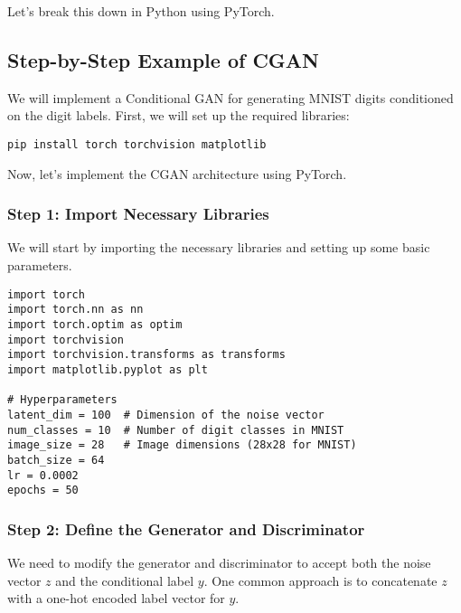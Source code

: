 Let's break this down in Python using PyTorch.

\subsection{Step-by-Step Example of CGAN}
We will implement a Conditional GAN for generating MNIST digits conditioned on the digit labels. First, we will set up the required libraries:

\begin{lstlisting}[style=cmd]
pip install torch torchvision matplotlib
\end{lstlisting}

Now, let's implement the CGAN architecture using PyTorch.

\subsubsection{Step 1: Import Necessary Libraries}
We will start by importing the necessary libraries and setting up some basic parameters.

\begin{lstlisting}[style=python]
import torch
import torch.nn as nn
import torch.optim as optim
import torchvision
import torchvision.transforms as transforms
import matplotlib.pyplot as plt

# Hyperparameters
latent_dim = 100  # Dimension of the noise vector
num_classes = 10  # Number of digit classes in MNIST
image_size = 28   # Image dimensions (28x28 for MNIST)
batch_size = 64
lr = 0.0002
epochs = 50
\end{lstlisting}

\subsubsection{Step 2: Define the Generator and Discriminator}
We need to modify the generator and discriminator to accept both the noise vector \( z \) and the conditional label \( y \). One common approach is to concatenate \( z \) with a one-hot encoded label vector for \( y \).


